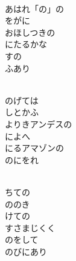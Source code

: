 \documentclass[10pt,b5j]{tarticle} %
\begin{document}
\begin{enumerate}
\begin{minipage}[c]{\blocksize}
        \vspace{\linespace}
        \item~\\
        あはれ「の」の\\
        をがに\\
        おほしつきの\\
        にたるかな\\
        すの\\
        ふあり
        
    \end{minipage}
    \begin{minipage}[c]{\blocksize}
        
        \vspace{\linespace}
        \item~\\
        のげては\\
        しとかふ\\
        よりきアンデスの\\
        によへ\\
        にるアマゾンの\\
        のにをれ
        
    \end{minipage}
    \begin{minipage}[c]{\blocksize}
        
        \vspace{\linespace}
        \item~\\
        ちての\\
        ののき\\
        けての\\
        すさまじくく\\
        のをして\\
        のびにあり
        

\end{minipage}
\end{enumerate}
\end{document}
